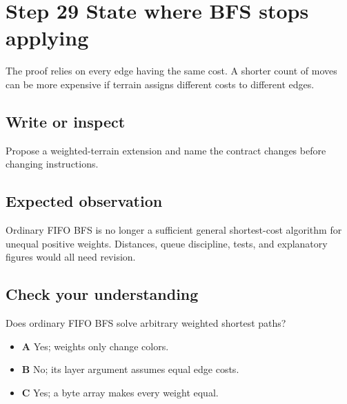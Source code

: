 \section{Step 29 State where BFS stops applying}\label{maze-s29}

The proof relies on every edge having the same cost. A shorter count of moves can be more expensive if terrain assigns different costs to different edges.

\subsection{Write or inspect}

Propose a weighted-terrain extension and name the contract changes before changing instructions.

\subsection{Expected observation}

Ordinary FIFO BFS is no longer a sufficient general shortest-cost algorithm for unequal positive weights. Distances, queue discipline, tests, and explanatory figures would all need revision.

\subsection{Check your understanding}

Does ordinary FIFO BFS solve arbitrary weighted shortest paths?

\begin{itemize}
  \item \textbf{A} Yes; weights only change colors.
  \item \textbf{B} No; its layer argument assumes equal edge costs.
  \item \textbf{C} Yes; a byte array makes every weight equal.
\end{itemize}
